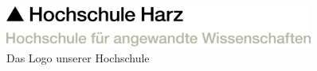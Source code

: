 
    \begin{figure}[H]
        \centering
        \includegraphics[width=0.9\textwidth]{graphics/HSHARZ.png}
        \caption[Hochschullogo]{Das Logo unserer Hochschule}
        \label{fig:appendix_logo}
    \end{figure}